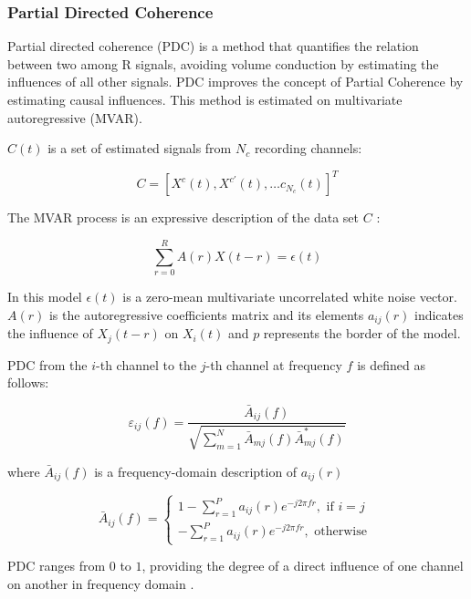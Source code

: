 \subsubsection{Partial Directed Coherence}

Partial directed coherence (PDC) is a method that quantifies the relation between two among $\mathrm{R}$ signals, avoiding volume conduction by estimating the influences of all other signals. PDC improves the concept of Partial Coherence by estimating causal influences. This method is estimated on multivariate autoregressive (MVAR).

$C(t)$ is a set of estimated signals from $N_c$ recording channels:

\begin{equation}
C=\left[X^{c}(t), X^{c'}(t), \ldots c_{N_c}(t)\right]^{T}
\end{equation}

The MVAR process is an expressive description of the data set $C$ :

\begin{equation}
\sum_{r=0}^{R} A(r) X(t-r)=\epsilon(t)
\end{equation}

In this model $\epsilon(t)$ is a zero-mean multivariate uncorrelated white noise vector. $A(r)$ is the autoregressive coefficients matrix and its elements $a_{i j}(r)$ indicates the influence of $X_{j}(t-r)$ on $X_{i}(t)$ and $p$ represents the border of the model.

PDC from the $i$-th channel to the $j$-th channel at frequency $f$ is defined as follows:

\begin{equation}
\varepsilon_{i j}(f)=\frac{\bar{A}_{i j}(f)}{\sqrt{\sum_{m=1}^{N} \bar{A}_{m j}(f) \bar{A}_{m j}^{*}(f)}}
\end{equation}

where $\bar{A}_{i j}(f)$ is a frequency-domain description of $a_{i j}(r)$

\begin{equation}
\bar{A}_{i j}(f)=\left\{\begin{array}{c}
1-\sum_{r=1}^{P} a_{i j}(r) e^{-j 2 \pi f r}, \text { if } i=j \\
-\sum_{r=1}^{P} a_{i j}(r) e^{-j 2 \pi f r}, \text { otherwise }
\end{array}\right.
\end{equation}

PDC ranges from $0$ to $1$, providing the degree of a direct influence of one channel on another in frequency domain \cite{gaxiola2017using}.

